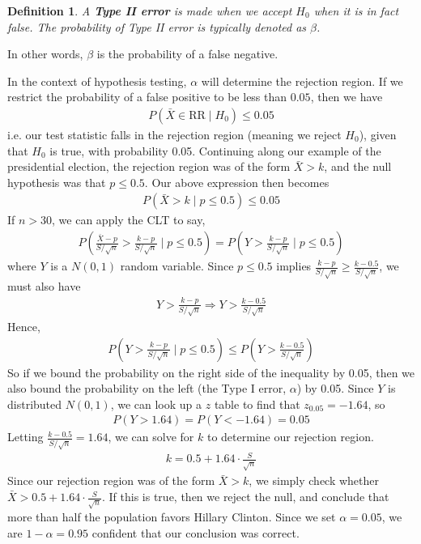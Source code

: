 \documentclass[11pt,letterpaper]{article}
\numberwithin{theorem}{section}
\newtheorem{definition}[theorem]{Definition}
\numberwithin{definition}{section}
\numberwithin{lemma}{section}
\numberwithin{corollary}{section}
\numberwithin{proposition}{section}
\theoremstyle{definition}
\numberwithin{remark}{section}
\numberwithin{claim}{section}
\numberwithin{observation}{section}
\numberwithin{fact}{section}
\numberwithin{assumption}{section}
\numberwithin{example}{section}
\numberwithin{exercise}{section}
\begin{document}
\begin{definition}
A \textbf{Type II error} is made when we accept $H_0$ when it is in fact false. The probability of Type II error is typically denoted as $\beta$.
\end{definition}
In other words, $\beta$ is the probability of a false negative.

In the context of hypothesis testing, $\alpha$ will determine the rejection region. If we restrict the probability of a false positive to be less than $0.05$, then we have
\begin{align*}
P(\bar{X} \in \text{RR} \mid H_0 ) \leq 0.05
\end{align*}
i.e. our test statistic falls in the rejection region (meaning we reject $H_0$), given that $H_0$ is true, with probability 0.05. Continuing along our example of the presidential election, the rejection region was of the form $\bar{X} > k$, and the null hypothesis was that $p \leq 0.5$. Our above expression then becomes
\begin{align*}
P(\bar{X} > k \mid p \leq 0.5) \leq 0.05
\end{align*}
If $n > 30$, we can apply the CLT to say,
\begin{align*}
P(\frac{\bar{X}-p}{S/\sqrt{n}} > \frac{k-p}{S/\sqrt{n}} \mid p \leq 0.5) = P(Y > \frac{k-p}{S/\sqrt{n}} \mid p \leq 0.5) 
\end{align*}
where $Y$ is a $N(0,1)$ random variable. Since $p \leq 0.5$ implies $\frac{k-p}{S/\sqrt{n}} \geq \frac{k-0.5}{S/\sqrt{n}}$, we must also have
\begin{align*}
Y > \frac{k - p}{S/\sqrt{n}} \Rightarrow Y > \frac{k-0.5}{S/\sqrt{n}}
\end{align*}
Hence,
\begin{align*}
P(Y > \frac{k-p}{S/\sqrt{n}} \mid p \leq 0.5) \leq P(Y > \frac{k-0.5}{S/\sqrt{n}})
\end{align*}
So if we bound the probability on the right side of the inequality by 0.05, then we also bound the probability on the left (the Type I error, $\alpha$) by 0.05. Since $Y$ is distributed $N(0,1)$, we can look up a $z$ table to find that $z_{0.05} = -1.64$, so
\begin{align*}
P(Y > 1.64) = P(Y < -1.64) = 0.05
\end{align*}
Letting $\frac{k-0.5}{S/\sqrt{n}} = 1.64$, we can solve for $k$ to determine our rejection region. 
\begin{align*}
k = 0.5 + 1.64 \cdot \frac{S}{\sqrt{n}}
\end{align*}
Since our rejection region was of the form $\bar{X} > k$, we simply check whether $\bar{X} > 0.5 + 1.64 \cdot \frac{S}{\sqrt{n}}$. If this is true, then we reject the null, and conclude that more than half the population favors Hillary Clinton. Since we set $\alpha = 0.05$, we are $1-\alpha = 0.95$ confident that our conclusion was correct.
\end{document}
